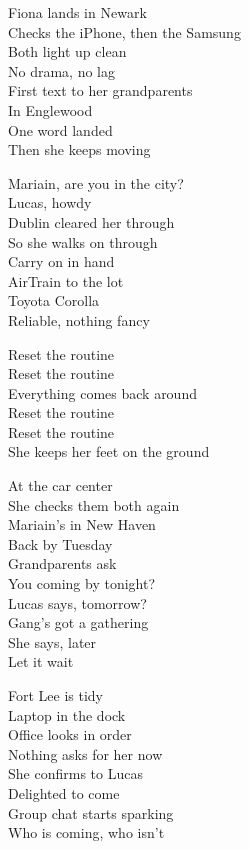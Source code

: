 \begin{lyrics}
Fiona lands in Newark\\
Checks the iPhone, then the Samsung\\
Both light up clean\\
No drama, no lag\\
First text to her grandparents\\
In Englewood\\
One word landed\\
Then she keeps moving

Mariain, are you in the city?\\
Lucas, howdy\\
Dublin cleared her through\\
So she walks on through\\
Carry on in hand\\
AirTrain to the lot\\
Toyota Corolla\\
Reliable, nothing fancy

Reset the routine\\
Reset the routine\\
Everything comes back around\\
Reset the routine\\
Reset the routine\\
She keeps her feet on the ground

At the car center\\
She checks them both again\\
Mariain’s in New Haven\\
Back by Tuesday\\
Grandparents ask\\
You coming by tonight?\\
Lucas says, tomorrow?\\
Gang’s got a gathering\\
She says, later\\
Let it wait

Fort Lee is tidy\\
Laptop in the dock\\
Office looks in order\\
Nothing asks for her now\\
She confirms to Lucas\\
Delighted to come\\
Group chat starts sparking\\
Who is coming, who isn’t


\end{lyrics}
